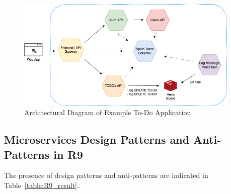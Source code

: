 \documentclass{Configuration_Files/PoliMi3i_thesis}
\begin{document}
\begin{figure}[H]
\centering
\includegraphics[width=0.95\textwidth]{myImages/R9.png}
\caption{Architectural Diagram of Example To-Do Application}
\label{fig:R9_arch}
\end{figure}

\subsection{Microservices Design Patterns and Anti-Patterns in R9}
\label{subsec:R9_detection}

The presence of design patterns and anti-patterns are indicated in Table~\ref{table:R9_result}.
\end{document}
